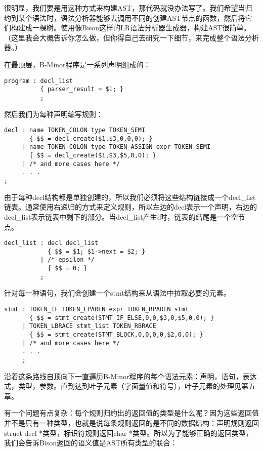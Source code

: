 \documentclass[cn,11pt,chinese]{elegantbook}
\begin{document}
很明显，我们要是用这种方式来构建AST，那代码就没办法写了。我们希望当归约到某个语法时，语法分析器能够去调用不同的创建AST节点的函数，然后将它们构建成一棵树。使用像Bison这样的LR语法分析器生成器，构建AST很简单。（这里我会大概告诉你怎么做，但你得自己去研究一下细节，来完成整个语法分析器。）

在最顶层，B-Minor程序是一系列声明组成的：

\begin{verbatim}
program : decl_list
          { parser_result = $1; }
          ;
\end{verbatim}

然后我们为每种声明编写规则：

\begin{verbatim}
decl : name TOKEN_COLON type TOKEN_SEMI
       { $$ = decl_create($1,$3,0,0,0); }
     | name TOKEN_COLON type TOKEN_ASSIGN expr TOKEN_SEMI
       { $$ = decl_create($1,$3,$5,0,0); }
     | /* and more cases here */
     . . .
;
\end{verbatim}

由于每种decl结构都是单独创建的，所以我们必须将这些结构链接成一个decl\_list链表。通常使用右递归的方式来定义规则，所以左边的decl表示一个声明，右边的decl\_list表示链表中剩下的部分。当decl\_list产生$\epsilon$时，链表的结尾是一个空节点。

\begin{verbatim}
decl_list : decl decl_list
            { $$ = $1; $1->next = $2; }
          | /* epsilon */
            { $$ = 0; }
          ;
\end{verbatim}

针对每一种语句，我们会创建一个stmt结构来从语法中拉取必要的元素。

\begin{verbatim}
stmt : TOKEN_IF TOKEN_LPAREN expr TOKEN_RPAREN stmt
       { $$ = stmt_create(STMT_IF_ELSE,0,0,$3,0,$5,0,0); }
     | TOKEN_LBRACE stmt_list TOKEN_RBRACE
       { $$ = stmt_create(STMT_BLOCK,0,0,0,0,$2,0,0); }
     | /* and more cases here */
     . . .
     ;
\end{verbatim}

沿着这条路线自顶向下一直遍历B-Minor程序的每个语法元素：声明，语句，表达式，类型，参数。直到达到叶子元素（字面量值和符号），叶子元素的处理见第五章。

有一个问题有点复杂：每个规则归约出的返回值的类型是什么呢？因为这些返回值并不是只有一种类型，也就是说每条规则返回的是不同的数据结构：声明规则返回struct decl *类型，标识符规则返回char *类型。所以为了能够正确的返回类型，我们会告诉Bison返回的语义值是AST所有类型的联合：
\end{document}
